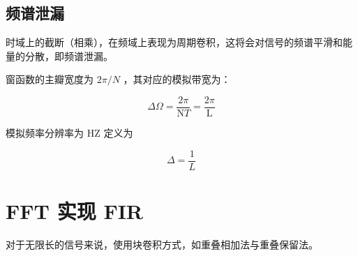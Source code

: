 \documentclass[cn,11pt,chinese,black,simple]{../elegantbook}
\begin{document}
\subsection{频谱泄漏}

时域上的截断（相乘），在频域上表现为周期卷积，这将会对信号的频谱平滑和能量的分散，即频谱泄漏。

窗函数的主瓣宽度为 \(2\pi / N\) ，其对应的模拟带宽为：

\[
\Delta \Omega=\frac{2 \pi}{\mathrm{N} T}=\frac{2 \pi}{\mathrm{L}}
\]

模拟频率分辨率为 HZ 定义为 

\[\Delta = \frac{1}{L}\] 

\section{FFT 实现 FIR}

对于无限长的信号来说，使用块卷积方式，如重叠相加法与重叠保留法。


\let\chapname\undefined
\ifx\mainclass\undefined
\end{document}
